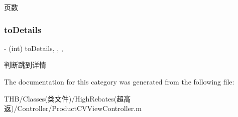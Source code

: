页数 \mbox{\label{category_product_c_v_view_controller_07_08_aa43122362d7320215fbe05b731585a24}} 
\subsubsection{\texorpdfstring{to\+Details}{toDetails}}
{\footnotesize\ttfamily -\/ (int) to\+Details\hspace{0.3cm}{\ttfamily [read]}, {\ttfamily [write]}, {\ttfamily [nonatomic]}, {\ttfamily [assign]}}

判断跳到详情 

The documentation for this category was generated from the following file\+:\begin{DoxyCompactItemize}
\item 
T\+H\+B/\+Classes(类文件)/\+High\+Rebates(超高返)/\+Controller/Product\+C\+V\+View\+Controller.\+m\end{DoxyCompactItemize}
